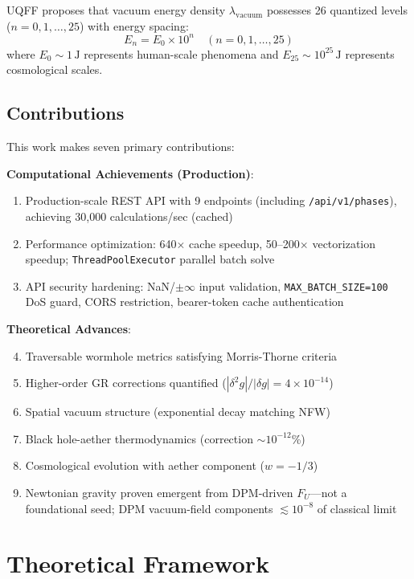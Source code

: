 \documentclass[12pt,a4paper]{article}
\begin{document}
UQFF proposes that vacuum energy density $\lambda_{\text{vacuum}}$ possesses 26 quantized levels ($n = 0, 1, \ldots, 25$) with energy spacing:
\begin{equation}
E_n = E_0 \times 10^n \quad (n = 0, 1, \ldots, 25)
\label{eq:energy_levels}
\end{equation}
where $E_0 \sim 1\,\text{J}$ represents human-scale phenomena and $E_{25} \sim 10^{25}\,\text{J}$ represents cosmological scales.

\subsection{Contributions}

This work makes seven primary contributions:

\textbf{Computational Achievements (Production)}:
\begin{enumerate}
    \item Production-scale REST API with 9 endpoints (including \texttt{/api/v1/phases}), achieving 30,000 calculations/sec (cached)
    \item Performance optimization: 640$\times$ cache speedup, 50--200$\times$ vectorization speedup; \texttt{ThreadPoolExecutor} parallel batch solve
    \item API security hardening: NaN/$\pm\infty$ input validation, \texttt{MAX\_BATCH\_SIZE=100} DoS guard, CORS restriction, bearer-token cache authentication
\end{enumerate}

\textbf{Theoretical Advances}:
\begin{enumerate}
    \setcounter{enumi}{3}
    \item Traversable wormhole metrics satisfying Morris-Thorne criteria
    \item Higher-order GR corrections quantified ($|\delta^2 g|/|\delta g| = 4 \times 10^{-14}$)
    \item Spatial vacuum structure (exponential decay matching NFW)
    \item Black hole-aether thermodynamics (correction $\sim 10^{-12}$\%)
    \item Cosmological evolution with aether component ($w = -1/3$)
    \item Newtonian gravity proven emergent from DPM-driven $F_U$---not a foundational seed; DPM vacuum-field components $\lesssim 10^{-8}$ of classical limit
\end{enumerate}

\section{Theoretical Framework}
\end{document}
